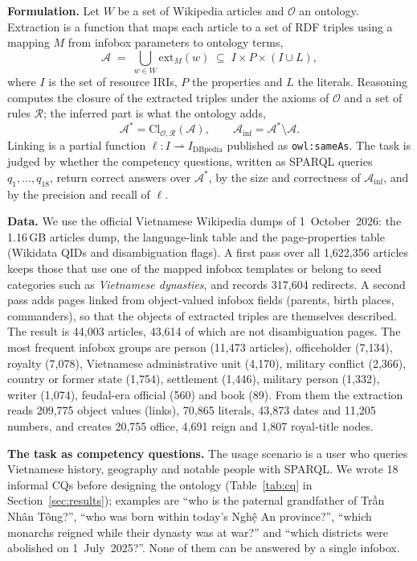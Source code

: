 \documentclass{article}
\newcommand{\ttl}[1]{\texttt{#1}}          %
\begin{document}
\textbf{Formulation.} Let $W$ be a set of Wikipedia articles and $\mathcal{O}$ an ontology. Extraction is a function
that maps each article to a set of RDF triples using a mapping $M$ from infobox parameters to ontology terms,
\begin{equation}
  \mathcal{A} \;=\; \bigcup_{w \in W} \mathrm{ext}_M(w) \;\subseteq\; I \times P \times (I \cup L),
\end{equation}
where $I$ is the set of resource IRIs, $P$ the properties and $L$ the literals. Reasoning computes the closure of the
extracted triples under the axioms of $\mathcal{O}$ and a set of rules $\mathcal{R}$; the inferred part is what the
ontology adds,
\begin{equation}
  \mathcal{A}^{*} = \mathrm{Cl}_{\mathcal{O},\mathcal{R}}(\mathcal{A}), \qquad
  \mathcal{A}_{\mathrm{inf}} = \mathcal{A}^{*} \setminus \mathcal{A}.
\end{equation}
Linking is a partial function $\ell : I \rightharpoonup I_{\mathrm{DBpedia}}$ published as \ttl{owl:sameAs}. The task is
judged by whether the competency questions, written as SPARQL queries $q_1,\dots,q_{18}$, return correct answers over
$\mathcal{A}^{*}$, by the size and correctness of $\mathcal{A}_{\mathrm{inf}}$, and by the precision and recall of $\ell$.

\textbf{Data.} We use the official Vietnamese Wikipedia dumps of 1~October~2026: the 1.16\,GB articles dump, the
language-link table and the page-properties table (Wikidata QIDs and disambiguation flags). A first pass over all
1{,}622{,}356 articles keeps those that use one of the mapped infobox templates or belong to seed categories such as
\emph{Vietnamese dynasties}, and records 317{,}604 redirects. A second pass adds pages linked from object-valued infobox
fields (parents, birth places, commanders), so that the objects of extracted triples are themselves described. The
result is 44{,}003 articles, 43{,}614 of which are not disambiguation pages. The most frequent infobox groups are
person (11{,}473 articles), officeholder (7{,}134), royalty (7{,}078), Vietnamese administrative unit (4{,}170),
military conflict (2{,}366), country or former state (1{,}754), settlement (1{,}446), military person (1{,}332), writer
(1{,}074), feudal-era official (560) and book (89). From them the extraction reads 209{,}775 object values (links),
70{,}865 literals, 43{,}873 dates and 11{,}205 numbers, and creates 20{,}755 office, 4{,}691 reign and 1{,}807
royal-title nodes.

\textbf{The task as competency questions.} The usage scenario is a user who queries Vietnamese history, geography and
notable people with SPARQL. We wrote 18 informal CQs before designing the ontology (Table~\ref{tab:cq} in
Section~\ref{sec:results}); examples are ``who is the paternal grandfather of Trần Nhân Tông?'', ``who was born within
today's Nghệ An province?'', ``which monarchs reigned while their dynasty was at war?'' and ``which districts were
abolished on 1~July~2025?''. None of them can be answered by a single infobox.
\end{document}
